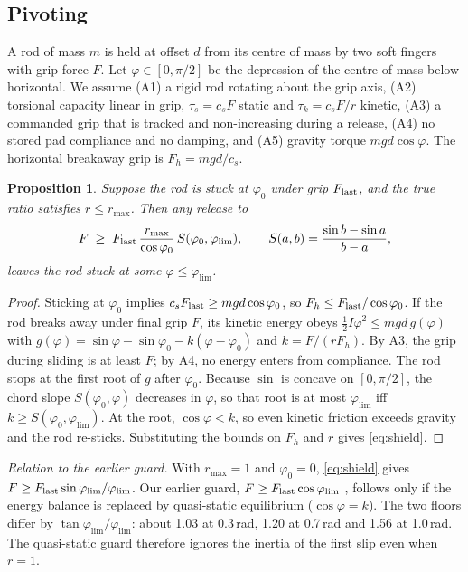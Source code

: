 \documentclass[10pt,twocolumn,letterpaper]{article}
\newtheorem{proposition}{Proposition}
\begin{document}
\subsection{Pivoting}
A rod of mass $m$ is held at offset $d$ from its centre of mass by two soft fingers with grip force $F$. Let $\varphi\in[0,\pi/2]$ be the depression of the centre of mass below horizontal. We assume (A1) a rigid rod rotating about the grip axis, (A2) torsional capacity linear in grip, $\tau_s=c_sF$ static and $\tau_k=c_sF/r$ kinetic, (A3) a commanded grip that is tracked and non-increasing during a release, (A4) no stored pad compliance and no damping, and (A5) gravity torque $mgd\cos\varphi$. The horizontal breakaway grip is $F_h=mgd/c_s$.

\begin{proposition}\label{prop:pivot}
Suppose the rod is stuck at $\varphi_0$ under grip $F_{\rm last}$, and the true ratio satisfies $r\le r_{\max}$. Then any release to
\begin{equation}
F \;\ge\; F_{\rm last}\,\frac{r_{\max}}{\cos\varphi_0}\,S(\varphi_0,\varphi_{\lim}),\qquad S(a,b)=\frac{\sin b-\sin a}{b-a},\label{eq:shield}
\end{equation}
leaves the rod stuck at some $\varphi\le\varphi_{\lim}$.
\end{proposition}
\begin{proof}
Sticking at $\varphi_0$ implies $c_sF_{\rm last}\ge mgd\cos\varphi_0$, so $F_h\le F_{\rm last}/\cos\varphi_0$. If the rod breaks away under final grip $F$, its kinetic energy obeys $\tfrac12 I\dot\varphi^2\le mgd\,g(\varphi)$ with $g(\varphi)=\sin\varphi-\sin\varphi_0-k(\varphi-\varphi_0)$ and $k=F/(rF_h)$. By A3, the grip during sliding is at least $F$; by A4, no energy enters from compliance. The rod stops at the first root of $g$ after $\varphi_0$. Because $\sin$ is concave on $[0,\pi/2]$, the chord slope $S(\varphi_0,\varphi)$ decreases in $\varphi$, so that root is at most $\varphi_{\lim}$ iff $k\ge S(\varphi_0,\varphi_{\lim})$. At the root, $\cos\varphi<k$, so even kinetic friction exceeds gravity and the rod re-sticks. Substituting the bounds on $F_h$ and $r$ gives \eqref{eq:shield}.
\end{proof}

\noindent\emph{Relation to the earlier guard.} With $r_{\max}=1$ and $\varphi_0=0$, \eqref{eq:shield} gives $F\ge F_{\rm last}\sin\varphi_{\lim}/\varphi_{\lim}$. Our earlier guard, $F\ge F_{\rm last}\cos\varphi_{\lim}$ \cite{aidoo2026b}, follows only if the energy balance is replaced by quasi-static equilibrium ($\cos\varphi=k$). The two floors differ by $\tan\varphi_{\lim}/\varphi_{\lim}$: about 1.03 at 0.3\,rad, 1.20 at 0.7\,rad and 1.56 at 1.0\,rad. The quasi-static guard therefore ignores the inertia of the first slip even when $r=1$.
\end{document}
